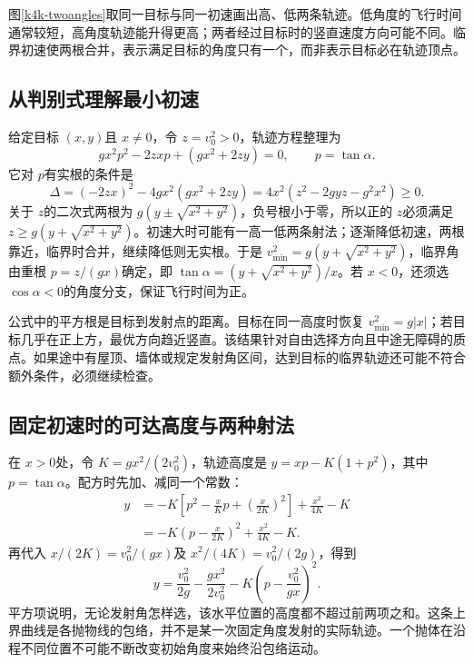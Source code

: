 图\ref{k4k-twoangles}取同一目标与同一初速画出高、低两条轨迹。低角度的飞行时间通常较短，高角度轨迹能升得更高；两者经过目标时的竖直速度方向可能不同。临界初速使两根合并，表示满足目标的角度只有一个，而非表示目标必在轨迹顶点。


\subsection{从判别式理解最小初速}
给定目标 $(x,y)$且 $x\ne0$，令 $z=v_0^2>0$，轨迹方程整理为
\[gx^2p^2-2zxp+(gx^2+2zy)=0,\qquad p=\tan\alpha.\]
它对 $p$有实根的条件是
\[\Delta=(-2zx)^2-4gx^2(gx^2+2zy)
 =4x^2(z^2-2gyz-g^2x^2)\ge0.\]
关于 $z$的二次式两根为 $g(y\pm\sqrt{x^2+y^2})$，负号根小于零，所以正的 $z$必须满足 $z\ge g(y+\sqrt{x^2+y^2})$。初速大时可能有一高一低两条射法；逐渐降低初速，两根靠近，临界时合并，继续降低则无实根。于是 $v_{\min}^2=g(y+\sqrt{x^2+y^2})$，临界角由重根 $p=z/(gx)$确定，即 $\tan\alpha=(y+\sqrt{x^2+y^2})/x$。若 $x<0$，还须选 $\cos\alpha<0$的角度分支，保证飞行时间为正。

公式中的平方根是目标到发射点的距离。目标在同一高度时恢复 $v_{\min}^2=g|x|$；若目标几乎在正上方，最优方向趋近竖直。该结果针对自由选择方向且中途无障碍的质点。如果途中有屋顶、墙体或规定发射角区间，达到目标的临界轨迹还可能不符合额外条件，必须继续检查。

\subsection{固定初速时的可达高度与两种射法}
在 $x>0$处，令 $K=gx^2/(2v_0^2)$，轨迹高度是 $y=xp-K(1+p^2)$，其中 $p=\tan\alpha$。配方时先加、减同一个常数：
\begin{align*}
 y&=-K\left[p^2-\frac xKp+\left(\frac{x}{2K}\right)^2\right]
 +\frac{x^2}{4K}-K\\
 &=-K\left(p-\frac{x}{2K}\right)^2
 +\frac{x^2}{4K}-K.
\end{align*}
再代入 $x/(2K)=v_0^2/(gx)$及 $x^2/(4K)=v_0^2/(2g)$，得到
\[y=\frac{v_0^2}{2g}-\frac{gx^2}{2v_0^2}
-K\left(p-\frac{v_0^2}{gx}\right)^2.\]
平方项说明，无论发射角怎样选，该水平位置的高度都不超过前两项之和。这条上界曲线是各抛物线的包络，并不是某一次固定角度发射的实际轨迹。一个抛体在沿程不同位置不可能不断改变初始角度来始终沿包络运动。

